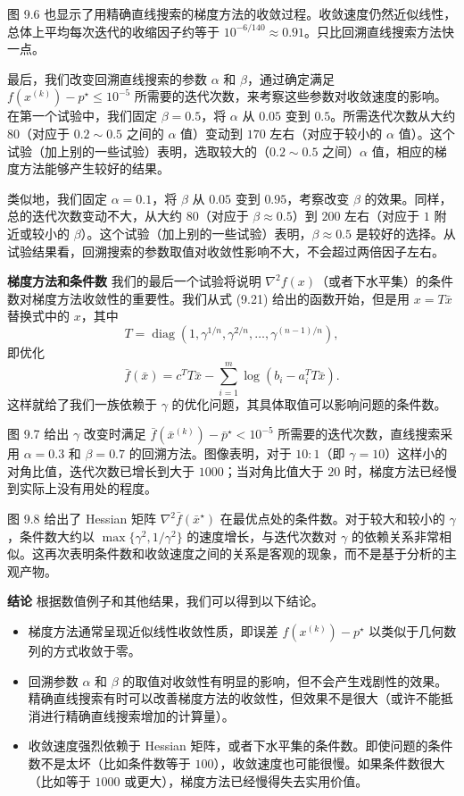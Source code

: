 \documentclass[UTF8,12pt,a4paper,fontset=fandol]{ctexart}
\begin{document}
图 9.6 也显示了用精确直线搜索的梯度方法的收敛过程。收敛速度仍然近似线性，总体上平均每次迭代的收缩因子约等于 $10^{-6/140}\approx0.91$。只比回溯直线搜索方法快一点。

最后，我们改变回溯直线搜索的参数 $\alpha$ 和 $\beta$，通过确定满足 $f(x^{(k)})-p^\star\leq10^{-5}$ 所需要的迭代次数，来考察这些参数对收敛速度的影响。在第一个试验中，我们固定 $\beta=0.5$，将 $\alpha$ 从 $0.05$ 变到 $0.5$。所需迭代次数从大约 $80$（对应于 $0.2\sim0.5$ 之间的 $\alpha$ 值）变动到 $170$ 左右（对应于较小的 $\alpha$ 值）。这个试验（加上别的一些试验）表明，选取较大的（$0.2\sim0.5$ 之间）$\alpha$ 值，相应的梯度方法能够产生较好的结果。

类似地，我们固定 $\alpha=0.1$，将 $\beta$ 从 $0.05$ 变到 $0.95$，考察改变 $\beta$ 的效果。同样，总的迭代次数变动不大，从大约 $80$（对应于 $\beta\approx0.5$）到 $200$ 左右（对应于 $1$ 附近或较小的 $\beta$）。这个试验（加上别的一些试验）表明，$\beta\approx0.5$ 是较好的选择。从试验结果看，回溯搜索的参数取值对收敛性影响不大，不会超过两倍因子左右。

\noindent\textbf{梯度方法和条件数}\quad
我们的最后一个试验将说明 $\nabla^2 f(x)$（或者下水平集）的条件数对梯度方法收敛性的重要性。我们从式 (9.21) 给出的函数开始，但是用 $x=T\bar{x}$ 替换式中的 $x$，其中
\[
T=\operatorname{diag}(1,\gamma^{1/n},\gamma^{2/n},\ldots,\gamma^{(n-1)/n}),
\]
即优化
\begin{equation}
\bar{f}(\bar{x})=c^TT\bar{x}-\sum_{i=1}^m\log(b_i-a_i^TT\bar{x}).
\tag{9.22}
\end{equation}
这样就给了我们一族依赖于 $\gamma$ 的优化问题，其具体取值可以影响问题的条件数。

图 9.7 给出 $\gamma$ 改变时满足 $\bar{f}(\bar{x}^{(k)})-\bar{p}^\star<10^{-5}$ 所需要的迭代次数，直线搜索采用 $\alpha=0.3$ 和 $\beta=0.7$ 的回溯方法。图像表明，对于 $10:1$（即 $\gamma=10$）这样小的对角比值，迭代次数已增长到大于 $1000$；当对角比值大于 $20$ 时，梯度方法已经慢到实际上没有用处的程度。

图 9.8 给出了 Hessian 矩阵 $\nabla^2\bar{f}(\bar{x}^\star)$ 在最优点处的条件数。对于较大和较小的 $\gamma$，条件数大约以 $\max\{\gamma^2,1/\gamma^2\}$ 的速度增长，与迭代次数对 $\gamma$ 的依赖关系非常相似。这再次表明条件数和收敛速度之间的关系是客观的现象，而不是基于分析的主观产物。

\noindent\textbf{结论}\quad
根据数值例子和其他结果，我们可以得到以下结论。
\begin{itemize}
\item 梯度方法通常呈现近似线性收敛性质，即误差 $f(x^{(k)})-p^\star$ 以类似于几何数列的方式收敛于零。
\item 回溯参数 $\alpha$ 和 $\beta$ 的取值对收敛性有明显的影响，但不会产生戏剧性的效果。精确直线搜索有时可以改善梯度方法的收敛性，但效果不是很大（或许不能抵消进行精确直线搜索增加的计算量）。
\item 收敛速度强烈依赖于 Hessian 矩阵，或者下水平集的条件数。即使问题的条件数不是太坏（比如条件数等于 $100$），收敛速度也可能很慢。如果条件数很大（比如等于 $1000$ 或更大），梯度方法已经慢得失去实用价值。
\end{itemize}
\end{document}
